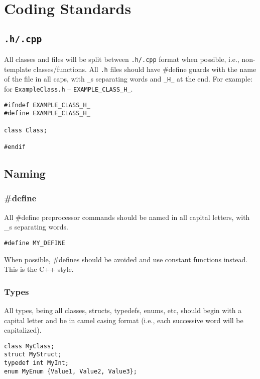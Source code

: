 \documentclass[12pt]{article}
\begin{document}
\section{Coding Standards}

\subsection{\texttt{.h/.cpp}}
All classes and files will be split between \texttt{.h/.cpp} format when
possible, i.e., non-template classes/functions. All \texttt{.h} files should
have \#define guards with the name of the file in all caps, with \texttt{\_}s
separating words and \texttt{\_H\_} at the end. For example: for
\texttt{ExampleClass.h} -- \texttt{EXAMPLE\_CLASS\_H\_}.

\begin{lstlisting}
#ifndef EXAMPLE_CLASS_H_
#define EXAMPLE_CLASS_H_

class Class;

#endif
\end{lstlisting}

\subsection{Naming}

\subsubsection{\#define}
All \#define preprocessor commands should be named in all capital letters, with
\_s separating words.

\begin{lstlisting}
#define MY_DEFINE
\end{lstlisting}

When possible, \#defines should be avoided and use constant functions instead.
This is the C++ style.

\subsubsection{Types}
All types, being all classes, structs, typedefs, enums, etc, should begin
with a capital letter and be in camel casing format (i.e., each successive word
will be capitalized).

\begin{lstlisting}
class MyClass;
struct MyStruct;
typedef int MyInt;
enum MyEnum {Value1, Value2, Value3};
\end{lstlisting}
\end{document}
